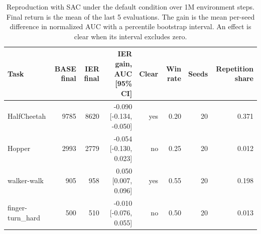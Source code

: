 \begin{table}[t]
\centering
\small
\begin{tabular}{lrrrrrrr}
\toprule
Task & BASE final & IER final & IER gain, AUC [95\% CI] & Clear & Win rate & Seeds & Repetition share \\
\midrule
HalfCheetah & 9785 & 8620 & -0.090 [-0.134, -0.050] & yes & 0.20 & 20 & 0.371 \\
Hopper & 2993 & 2779 & -0.054 [-0.130, 0.023] & no & 0.25 & 20 & 0.012 \\
walker-walk & 905 & 958 & 0.050 [0.007, 0.096] & yes & 0.55 & 20 & 0.198 \\
finger-turn\_hard & 500 & 510 & -0.010 [-0.076, 0.055] & no & 0.50 & 20 & 0.013 \\
\bottomrule
\end{tabular}
\caption{Reproduction with SAC under the default condition over 1M environment steps. Final return is the mean of the last 5 evaluations. The gain is the mean per-seed difference in normalized AUC with a percentile bootstrap interval. An effect is clear when its interval excludes zero.}
\label{tab:reproduction}
\end{table}
